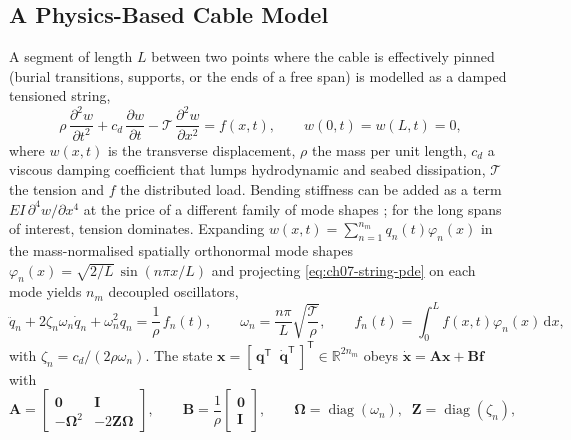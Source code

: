 \documentclass[graybox,envcountchap]{style/SNmono}
\providecommand{\DIFadd}[1]{{\protect\color{blue} #1}} %
\providecommand{\DIFdel}[1]{{\protect\color{red} #1}} %
\providecommand{\DIFaddbegin}{} %
\providecommand{\DIFaddend}{} %
\providecommand{\DIFdelbegin}{} %
\providecommand{\DIFdelend}{} %
\begin{document}
\subsection{A Physics-Based Cable Model}
\label{subsec:cable-model}
A segment of length $L$ between two points where the cable is effectively pinned (burial transitions, supports, or the ends of a free span) is modelled as a damped tensioned string,
\begin{equation}
\rho\,\frac{\partial^{2} w}{\partial t^{2}}+c_d\,\frac{\partial w}{\partial t}-\mathcal{T}\,\frac{\partial^{2} w}{\partial x^{2}}=f(x,t),
\qquad w(0,t)=w(L,t)=0,
\label{eq:ch07-string-pde}
\end{equation}
where $w(x,t)$ is the transverse displacement, $\rho$ the mass per unit length, $c_d$ a viscous damping coefficient that lumps hydrodynamic and seabed dissipation, $\mathcal{T}$ the tension and $f$ the distributed load. Bending stiffness can be added as a term $EI\,\partial^{4}w/\partial x^{4}$ at the price of a different family of mode shapes \cite{irvine_linear_1974}; for the long spans of interest, tension dominates. Expanding $w(x,t)=\sum_{n=1}^{n_m} q_n(t)\varphi_n(x)$ in the \DIFdelbegin \DIFdel{mass-normalised }\DIFdelend \DIFaddbegin \DIFadd{spatially orthonormal }\DIFaddend mode shapes $\varphi_n(x)=\sqrt{2/L}\,\sin(n\pi x/L)$ and projecting \eqref{eq:ch07-string-pde} on each mode yields $n_m$ decoupled oscillators,
\begin{equation}
\ddot q_n+2\zeta_n\omega_n\dot q_n+\omega_n^{2}q_n=\frac{1}{\rho}\,f_n(t),
\qquad
\omega_n=\frac{n\pi}{L}\sqrt{\frac{\mathcal{T}}{\rho}},
\qquad
f_n(t)=\int_0^{L} f(x,t)\varphi_n(x)\,\mathrm{d}x,
\label{eq:ch07-modal}
\end{equation}
with $\zeta_n=c_d/(2\rho\omega_n)$. The state $\mathbf{x}=[\,\mathbf{q}^{\mathsf T}\;\;\dot{\mathbf{q}}^{\mathsf T}\,]^{\mathsf T}\in\mathbb{R}^{2n_m}$ obeys $\dot{\mathbf{x}}=\mathbf{A}\mathbf{x}+\mathbf{B}\mathbf{f}$ with
\begin{equation}
\mathbf{A}=
\begin{bmatrix}
\mathbf{0} & \mathbf{I}\\ -\boldsymbol{\Omega}^{2} & -2\mathbf{Z}\boldsymbol{\Omega}
\end{bmatrix},
\qquad
\mathbf{B}=\frac{1}{\rho}
\begin{bmatrix}
\mathbf{0}\\ \mathbf{I}
\end{bmatrix},
\qquad
\boldsymbol{\Omega}=\operatorname{diag}(\omega_n),\;\;\mathbf{Z}=\operatorname{diag}(\zeta_n),
\label{eq:ch07-modal-ss}
\end{equation}
\end{document}
